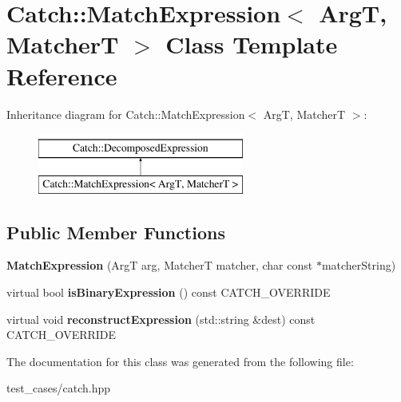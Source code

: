 \hypertarget{classCatch_1_1MatchExpression}{}\section{Catch\+:\+:Match\+Expression$<$ ArgT, MatcherT $>$ Class Template Reference}
\label{classCatch_1_1MatchExpression}
Inheritance diagram for Catch\+:\+:Match\+Expression$<$ ArgT, MatcherT $>$\+:\begin{figure}[H]
\begin{center}
\leavevmode
\includegraphics[height=2.000000cm]{classCatch_1_1MatchExpression}
\end{center}
\end{figure}
\subsection*{Public Member Functions}
\begin{DoxyCompactItemize}
\item 
\mbox{\label{classCatch_1_1MatchExpression_a506f25bad7970cb35f9dbe54763a8ca5}} 
{\bfseries Match\+Expression} (ArgT arg, MatcherT matcher, char const $\ast$matcher\+String)
\item 
\mbox{\label{classCatch_1_1MatchExpression_ac4edf6e9a6e5762a487db1486d0d1f45}} 
virtual bool {\bfseries is\+Binary\+Expression} () const C\+A\+T\+C\+H\+\_\+\+O\+V\+E\+R\+R\+I\+DE
\item 
\mbox{\label{classCatch_1_1MatchExpression_a4410a93bc5b8241eb2502f400fce7ec4}} 
virtual void {\bfseries reconstruct\+Expression} (std\+::string \&dest) const C\+A\+T\+C\+H\+\_\+\+O\+V\+E\+R\+R\+I\+DE
\end{DoxyCompactItemize}


The documentation for this class was generated from the following file\+:\begin{DoxyCompactItemize}
\item 
test\+\_\+cases/catch.\+hpp\end{DoxyCompactItemize}
